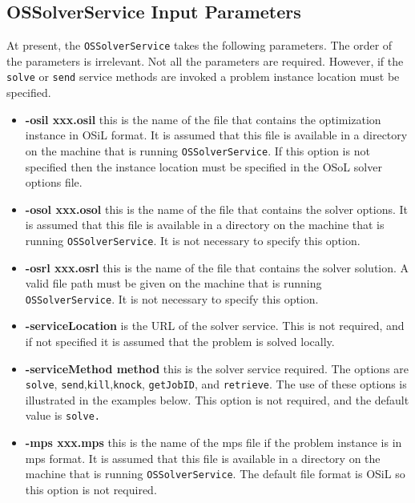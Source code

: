 \documentclass[11pt]{article}
\renewcommand{\_}{{\char"5F}}
\renewcommand{\{}{{\char"7B}}
\renewcommand{\}}{{\char"7D}}
\renewcommand{\^}{{\char"0D}}
\renewcommand{\'}{{\char"0D}}
\begin{document}
\subsection{OSSolverService Input Parameters}

At present, the {\tt OSSolverService} takes the following parameters. The order of the parameters is irrelevant.  Not all the parameters are required. However, if the {\tt solve} or {\tt send} service methods are invoked a problem instance location must be specified. 

\begin{itemize}

\item[] {\bf -osil xxx.osil}  this is the name of the file that contains the optimization instance in OSiL format. It is assumed that this file is available in a directory on the machine that is running {\tt OSSolverService}. If this option is not specified then the instance location must be specified in the OSoL solver options file.

\item[] {\bf -osol xxx.osol}  this is the name of the file that contains the solver options. It is assumed that this file is available in a directory on the machine that is running {\tt OSSolverService}. It is not necessary to specify this option.

\item[] {\bf -osrl xxx.osrl}  this is the name of the file that contains the solver solution. A valid file path must be given on the machine that is running {\tt OSSolverService}. It is not necessary to specify this option.

\item[] {\bf -serviceLocation}  is the URL of the solver service. This is not required, and if not specified it is assumed that the problem is solved locally. 

\item[] {\bf -serviceMethod  method}  this is  the solver service required. The options are {\tt solve}, {\tt send},{\tt kill},{\tt knock}, {\tt getJobID}, and {\tt retrieve}. The use of these options is illustrated in the examples below. This option is not required, and the default value is {\tt solve.}

\item[] {\bf -mps  xxx.mps}  this is the name of the mps file if the problem instance is in mps format. It is assumed that this file is available in a directory on the machine that is running {\tt OSSolverService}. The default file format is OSiL so this option is not required.


\end{itemize}
\end{document}
